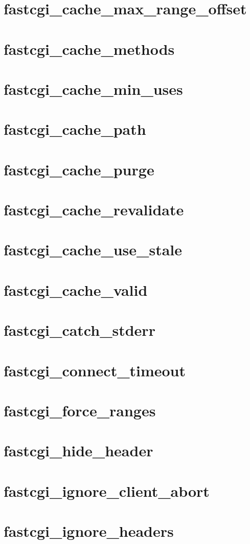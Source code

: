 \section{fastcgi\_cache\_max\_range\_offset}
\section{fastcgi\_cache\_methods}
\section{fastcgi\_cache\_min\_uses}
\section{fastcgi\_cache\_path}
\section{fastcgi\_cache\_purge}
\section{fastcgi\_cache\_revalidate}
\section{fastcgi\_cache\_use\_stale}
\section{fastcgi\_cache\_valid}
\section{fastcgi\_catch\_stderr}
\section{fastcgi\_connect\_timeout}
\section{fastcgi\_force\_ranges}
\section{fastcgi\_hide\_header}
\section{fastcgi\_ignore\_client\_abort}
\section{fastcgi\_ignore\_headers}
